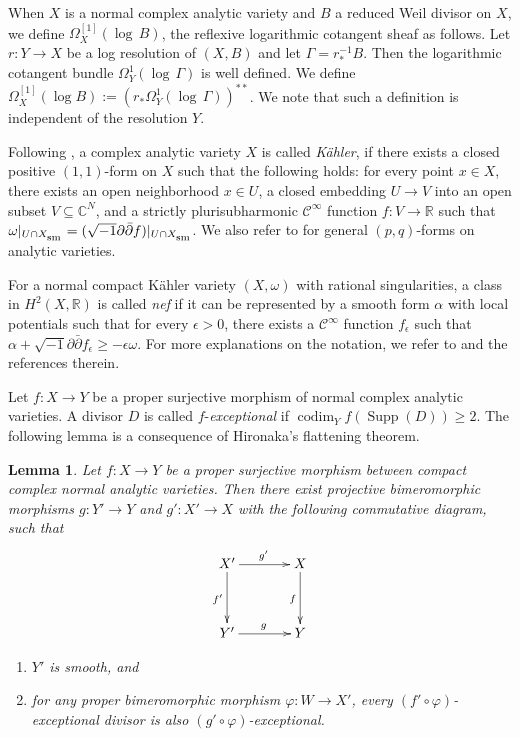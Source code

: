 \documentclass[12pt]{amsart}
\newcommand{\mbR}{\mathbb{R}}
\newcommand{\mbC}{\mathbb{C}}
\newcommand{\<}{\leq}
\def\>{\geq}
\def\subset{\subseteq}
\newtheorem{lemma}[theorem]{Lemma}
\theoremstyle{remark}
\theoremstyle{definition}
\theoremstyle{definition}
\numberwithin{equation}{section}
\theoremstyle{definition}
\theoremstyle{definition}
\def\Supp{\operatorname{Supp}}
\def\codim{\operatorname{codim}}
\def\sm{\operatorname{\textsubscript{\rm sm}}}
\begin{document}
When $X$ is a %
normal complex analytic variety and $B$ a reduced Weil divisor on $X$, we define  $\Omega^{[1]}_X(\log\, B)$, the reflexive logarithmic cotangent sheaf as follows. 
Let $r\colon Y\to X$ be a log resolution of $(X, B)$ and let $\Gamma=r_*^{-1}B$.  
Then the logarithmic cotangent bundle $\Omega_Y^{1}(\log\, \Gamma)$ is well defined. 
We define  $\Omega^{[1]}_X(\log B) := (r_* \Omega_Y^{1}(\log\, \Gamma) )^{**}$. 
We note that such a definition is independent of the resolution $Y$. 


Following   \cite{Grauert1962}, a complex analytic variety $X$ is  called \emph{K\"ahler}, 
if there exists a closed positive $(1, 1)$-form on $X$ such that the following holds: for every point $x\in X$,  there exists an open neighborhood $x\in U$,  a closed embedding $ U\to V$ into an open subset $V\subset\mbC^N$, and a strictly plurisubharmonic $\mathcal{C}^\infty$ function $f:V\to\mbR$ such that $\omega|_{U\cap X_{\sm}}=(\sqrt{-1}\partial\bar{\partial}f)|_{U\cap X_{\sm}}$.  
We also refer to \cite[Section 1]{Demailly1985} for general $(p,q)$-forms on analytic varieties.

For a normal compact K\"ahler variety $(X,\omega)$ with rational singularities, a class in $H^2(X, \mathbb{R})$ is called \emph{nef} if it can be represented by a smooth form $\alpha$ with local potentials such that 
for every $\epsilon >0$, there exists a $\mathcal C ^\infty$ function $f_\epsilon$ such that $\alpha + \sqrt{-1}\partial \bar \partial f_\epsilon \geq -\epsilon \omega$.  
For more explanations on the notation, we refer to \cite[Definition 2.1]{DasOu2022} and the references therein.

 


Let $f:X\to Y$ be a proper surjective morphism of normal complex analytic varieties. 
A divisor $D$ is called  $f$-\textit{exceptional} if $\codim_Y f(\Supp(D))\>2$.
The following lemma is a consequence of Hironaka's flattening theorem.  
 
\begin{lemma}\label{lemma:p-q-exceptional}
Let $f:X\to Y$ be a proper surjective morphism between  compact complex normal analytic varieties. 
Then there exist projective bimeromorphic morphisms $g\colon Y'\to Y$ and $g'\colon X'\to X$ with the following commutative diagram, such that
\begin{equation*}
        \xymatrixcolsep{3pc}\xymatrixrowsep{3pc}\xymatrix{X'\ar[r]^{g'}\ar[d]_{f'} & X\ar[d]_f\\
        Y'\ar[r]^g & Y}
\end{equation*}
\begin{enumerate} 
	\item $Y'$ is smooth, and 
	\item for any proper bimeromorphic morphism $\varphi\colon  W\to X'$, every $(f'\circ\varphi)$-exceptional divisor  is also $(g'\circ\varphi)$-exceptional.
\end{enumerate}
\end{lemma}
\end{document}
